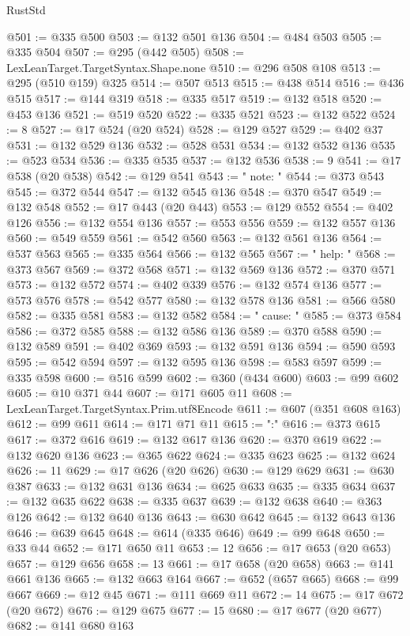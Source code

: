 \begin{lexlean}{RustStd}
\begin{coremodule}
@501 := @335 @500
@503 := @132 @501 @136
@504 := @484 @503
@505 := @335 @504
@507 := @295 (@442 @505)
@508 := LexLeanTarget.TargetSyntax.Shape.none
@510 := @296 @508 @108
@513 := @295 (@510 @159) @325
@514 := @507 @513
@515 := @438 @514
@516 := @436 @515
@517 := @144 @319
@518 := @335 @517
@519 := @132 @518
@520 := @453 @136
@521 := @519 @520
@522 := @335 @521
@523 := @132 @522
@524 := 8
@527 := @17 @524 (@20 @524)
@528 := @129 @527
@529 := @402 @37
@531 := @132 @529 @136
@532 := @528 @531
@534 := @132 @532 @136
@535 := @523 @534
@536 := @335 @535
@537 := @132 @536
@538 := 9
@541 := @17 @538 (@20 @538)
@542 := @129 @541
@543 := "  note: "
@544 := @373 @543
@545 := @372 @544
@547 := @132 @545 @136
@548 := @370 @547
@549 := @132 @548
@552 := @17 @443 (@20 @443)
@553 := @129 @552
@554 := @402 @126
@556 := @132 @554 @136
@557 := @553 @556
@559 := @132 @557 @136
@560 := @549 @559
@561 := @542 @560
@563 := @132 @561 @136
@564 := @537 @563
@565 := @335 @564
@566 := @132 @565
@567 := "  help: "
@568 := @373 @567
@569 := @372 @568
@571 := @132 @569 @136
@572 := @370 @571
@573 := @132 @572
@574 := @402 @339
@576 := @132 @574 @136
@577 := @573 @576
@578 := @542 @577
@580 := @132 @578 @136
@581 := @566 @580
@582 := @335 @581
@583 := @132 @582
@584 := "  cause: "
@585 := @373 @584
@586 := @372 @585
@588 := @132 @586 @136
@589 := @370 @588
@590 := @132 @589
@591 := @402 @369
@593 := @132 @591 @136
@594 := @590 @593
@595 := @542 @594
@597 := @132 @595 @136
@598 := @583 @597
@599 := @335 @598
@600 := @516 @599
@602 := @360 (@434 @600)
@603 := @99 @602
@605 := @10 @371 @44
@607 := @171 @605 @11
@608 := LexLeanTarget.TargetSyntax.Prim.utf8Encode
@611 := @607 (@351 @608 @163)
@612 := @99 @611
@614 := @171 @71 @11
@615 := ":"
@616 := @373 @615
@617 := @372 @616
@619 := @132 @617 @136
@620 := @370 @619
@622 := @132 @620 @136
@623 := @365 @622
@624 := @335 @623
@625 := @132 @624
@626 := 11
@629 := @17 @626 (@20 @626)
@630 := @129 @629
@631 := @630 @387
@633 := @132 @631 @136
@634 := @625 @633
@635 := @335 @634
@637 := @132 @635 @622
@638 := @335 @637
@639 := @132 @638
@640 := @363 @126
@642 := @132 @640 @136
@643 := @630 @642
@645 := @132 @643 @136
@646 := @639 @645
@648 := @614 (@335 @646)
@649 := @99 @648
@650 := @33 @44
@652 := @171 @650 @11
@653 := 12
@656 := @17 @653 (@20 @653)
@657 := @129 @656
@658 := 13
@661 := @17 @658 (@20 @658)
@663 := @141 @661 @136
@665 := @132 @663 @164
@667 := @652 (@657 @665)
@668 := @99 @667
@669 := @12 @45
@671 := @111 @669 @11
@672 := 14
@675 := @17 @672 (@20 @672)
@676 := @129 @675
@677 := 15
@680 := @17 @677 (@20 @677)
@682 := @141 @680 @163

\end{coremodule}
\end{lexlean}
